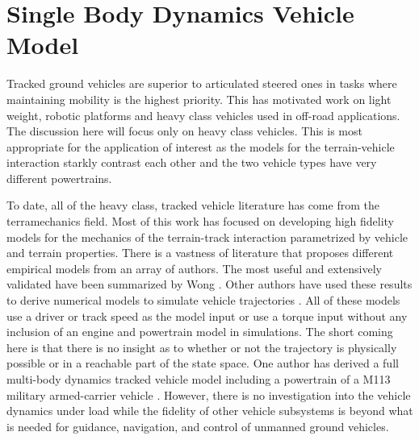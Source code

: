 \chapter{Single Body Dynamics Vehicle Model}\label{ch:RSBD}
Tracked ground vehicles are superior to articulated steered ones in tasks where maintaining mobility is the highest priority. This has motivated work on light weight, robotic platforms and heavy class vehicles used in off-road applications. The discussion here will focus only on heavy class vehicles. This is most appropriate for the application of interest as the models for the terrain-vehicle interaction starkly contrast each other and the two vehicle types have very different powertrains. 

To date, all of the heavy class, tracked vehicle literature has come from the terramechanics field. Most of this work has focused on developing high fidelity models for the mechanics of the terrain-track interaction parametrized by vehicle and terrain properties. There is a vastness of literature that proposes different empirical models from an array of authors. The most useful and extensively validated have been summarized by Wong \cite{Wong2008}. Other authors have used these results to derive numerical models to simulate vehicle trajectories \cite{kitano1976theoretical,kitano1977analysis,murakami1992mathematical,le1997estimation,ferretti1999modelling,ahmad2000path}. All of these models use a driver or track speed as the model input or use a torque input without any inclusion of an engine and powertrain model in simulations. The short coming here is that there is no insight as to whether or not the trajectory is physically possible or in a reachable part of the state space. One author has derived a full multi-body dynamics tracked vehicle model including a powertrain of a M113 military armed-carrier vehicle \cite{rubinstein2004detailed}. However, there is no investigation into the vehicle dynamics under load while the fidelity of other vehicle subsystems is beyond what is needed for guidance, navigation, and control of unmanned ground vehicles.

